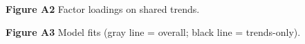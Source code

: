 \documentclass[notitlepage]{article}
\begin{document}
\begin{center}
\textbf{Figure A2} Factor loadings on shared trends.
\end{center}

\begin{center}
\textbf{Figure A3} Model fits (gray line = overall; black line = trends-only).
\end{center}
\end{document}

